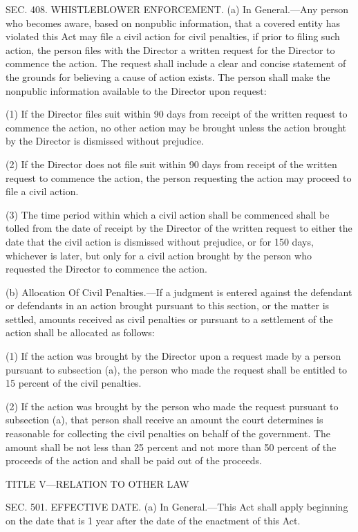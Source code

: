 SEC. 408. WHISTLEBLOWER ENFORCEMENT.
(a) In General.—Any person who becomes aware, based on nonpublic information, that a covered entity has violated this Act may file a civil action for civil penalties, if prior to filing such action, the person files with the Director a written request for the Director to commence the action. The request shall include a clear and concise statement of the grounds for believing a cause of action exists. The person shall make the nonpublic information available to the Director upon request:

(1) If the Director files suit within 90 days from receipt of the written request to commence the action, no other action may be brought unless the action brought by the Director is dismissed without prejudice.

(2) If the Director does not file suit within 90 days from receipt of the written request to commence the action, the person requesting the action may proceed to file a civil action.

(3) The time period within which a civil action shall be commenced shall be tolled from the date of receipt by the Director of the written request to either the date that the civil action is dismissed without prejudice, or for 150 days, whichever is later, but only for a civil action brought by the person who requested the Director to commence the action.

(b) Allocation Of Civil Penalties.—If a judgment is entered against the defendant or defendants in an action brought pursuant to this section, or the matter is settled, amounts received as civil penalties or pursuant to a settlement of the action shall be allocated as follows:

(1) If the action was brought by the Director upon a request made by a person pursuant to subsection (a), the person who made the request shall be entitled to 15 percent of the civil penalties.

(2) If the action was brought by the person who made the request pursuant to subsection (a), that person shall receive an amount the court determines is reasonable for collecting the civil penalties on behalf of the government. The amount shall be not less than 25 percent and not more than 50 percent of the proceeds of the action and shall be paid out of the proceeds.

TITLE V—RELATION TO OTHER LAW

SEC. 501. EFFECTIVE DATE.
(a) In General.—This Act shall apply beginning on the date that is 1 year after the date of the enactment of this Act.

